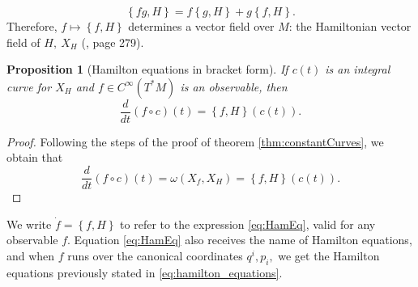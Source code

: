 \documentclass[12pt, letterpaper, reqno]{amsart}
\theoremstyle{definition}
\theoremstyle{plain}
\newtheorem{prop}{Proposition}
\theoremstyle{remark}
\begin{document}
$$ \left\{ fg,H \right\} =f \left\{ g,H \right\} +g \left\{ f,H \right\} . $$ 
Therefore, $ f\mapsto \left\{ f,H \right\}  $ determines a vector field over $M$: the Hamiltonian vector field of $ H, \ X_H $ (\cite{montgomery2002tour}, page 279).

\begin{prop}[Hamilton equations in bracket form]\label{prop:HEBF}
	If $ c(t) $ is an integral curve for $ X_H $ and $ f\in C^\infty(T^*M) $ is an observable, then
	\begin{equation}\label{eq:HamEq}
		\frac{d}{dt} \left( f\circ c \right)(t) = \left\{ f,H \right\} (c(t)).
	\end{equation}
\end{prop}
\begin{proof}
	Following the steps of the proof of theorem \ref{thm:constantCurves}, we obtain that
	$$ \frac{d}{dt} \left( f\circ c \right) (t)=\omega(X_f, X_H)= \left\{ f,H \right\}(c(t)).  $$ 
\end{proof}

We write $ \dot{f}= \left\{ f,H \right\} $ to refer to the expression \eqref{eq:HamEq}, valid for any observable $ f. $ Equation \eqref{eq:HamEq} also receives the name of Hamilton equations, and when $ f $ runs over the canonical coordinates $ q^i,p_i, $ we get the Hamilton equations previously stated in \eqref{eq:hamilton_equations}.
\end{document}
